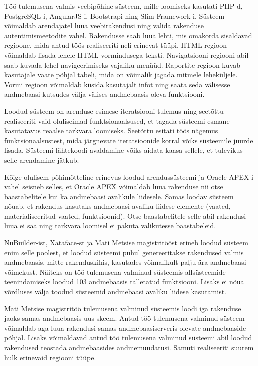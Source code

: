 \documentclass[a4paper,12pt]{article} %
\begin{document}
Töö tulemusena valmis veebipõhine süsteem, mille loomiseks kasutati PHP-d, PostgreSQL-i, AngularJS-i, Bootstrapi ning Slim Framework-i. Süsteem võimaldab arendajatel luua veebirakendusi ning valida rakenduse autentimismeetodite vahel. Rakendusse saab luua lehti, mis omakorda sisaldavad regioone, mida antud töös realiseeriti neli erinevat tüüpi. HTML-regioon võimaldab lisada lehele HTML-vormindusega teksti. Navigatsiooni regiooni abil saab kuvada lehel navigeerimiseks vajaliku menüüd. Raportite regioon kuvab kasutajale vaate põhjal tabeli, mida on võimalik jagada mitmele leheküljele. Vormi regioon võimaldab küsida kasutajalt infot ning saata seda välisesse andmebaasi kutsudes välja välises andmebaasis oleva funktsiooni.\par

Loodud süsteem on arenduse esimese iteratsiooni tulemus ning seetõttu realiseeriti vaid oluliseimad funktsionaalsused, et tagada süsteemi esmane kasutatavus reaalse tarkvara loomiseks. Seetõttu esitati töös nägemus funktsionaalsustest, mida järgnevate iteratsioonide korral võiks süsteemile juurde lisada. Süsteemi lähtekoodi avaldamine võiks aidata kaasa sellele, et tulevikus selle arendamine jätkub.\par

Kõige olulisem põhimõtteline erinevus loodud arendussüsteemi ja Oracle APEX-i vahel seisneb selles, et Oracle APEX võimaldab luua rakenduse nii otse baastabelitele kui ka andmebaasi avalikule liidesele. Samas loodav süsteem nõuab, et rakendus kasutaks andmebaasi avaliku liidese elemente (vaated, materialiseeritud vaated, funktsioonid). Otse baastabelitele selle abil rakendusi luua ei saa ning tarkvara loomisel ei pakuta valikutesse baastabeleid.
\par
NuBuilder-ist, Xataface-st ja Mati Metsise magistritööst erineb loodud süsteem enim selle poolest, et loodud süsteemi puhul genereeritakse rakendused valmis andmebaasis, mitte rakenduskihis, kasutades võimalikult palju ära andmebaasi võimekust. Näiteks on töö tulemusena valminud süsteemis allsüsteemide teenindamiseks loodud 103 andmebaasis talletatud funktsiooni. Lisaks ei  nõua võrdluses välja toodud süsteemid andmebaasi avaliku liidese kasutamist.
\par
Mati Metsise magistritöö tulemusena valminud süsteemis loodi iga rakenduse jaoks samas andmebaasis uus skeem. Antud töö tulemusena valminud süsteem võimaldab aga luua rakendusi samas andmebaasiserveris olevate andmebaaside põhjal.
Lisaks võimaldavad antud töö tulemusena valminud süsteemi abil loodud rakendused teostada andmebaasides andmemuudatusi. Samuti realiseeriti suurem hulk erinevaid regiooni tüüpe.
\par
\end{document}

